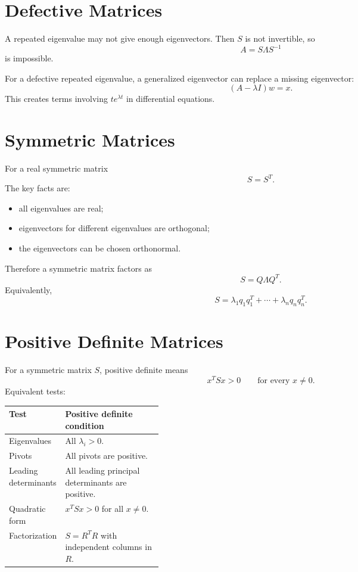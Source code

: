\documentclass[10pt]{article}
\begin{document}

\section{Defective Matrices}

A repeated eigenvalue may not give enough eigenvectors. Then \(S\) is not invertible, so
\[
A=S\Lambda S^{-1}
\]
is impossible.

For a defective repeated eigenvalue, a generalized eigenvector can replace a missing eigenvector:
\[
(A-\lambda I)w=x.
\]
This creates terms involving \(te^{\lambda t}\) in differential equations.


\section{Symmetric Matrices}

For a real symmetric matrix
\[
S=S^{T}.
\]
The key facts are:
\begin{itemize}
  \item all eigenvalues are real;
  \item eigenvectors for different eigenvalues are orthogonal;
  \item the eigenvectors can be chosen orthonormal.
\end{itemize}

Therefore a symmetric matrix factors as
\[
S=Q\Lambda Q^{T}.
\]
Equivalently,
\[
S=\lambda_1q_1q_1^{T}+\cdots+\lambda_nq_nq_n^{T}.
\]


\section{Positive Definite Matrices}

For a symmetric matrix \(S\), positive definite means
\[
x^{T}Sx>0
\qquad
\text{for every }x\ne0.
\]
Equivalent tests:

\begin{center}
\small
\begin{tabularx}{\linewidth}{@{}L{0.30\linewidth}Y@{}}
\toprule
Test & Positive definite condition \\
\midrule
Eigenvalues & All \(\lambda_i>0\). \\
Pivots & All pivots are positive. \\
Leading determinants & All leading principal determinants are positive. \\
Quadratic form & \(x^{T}Sx>0\) for all \(x\ne0\). \\
Factorization & \(S=R^{T}R\) with independent columns in \(R\). \\
\bottomrule
\end{tabularx}
\end{center}
\end{document}
